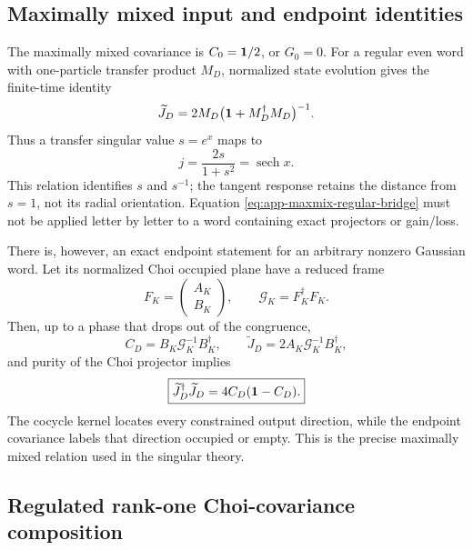 \subsection{Maximally mixed input and endpoint identities}

The maximally mixed covariance is \(C_0=\mathbf{1}/2\), or \(G_0=0\).  For a
regular even word with one-particle transfer product \(M_D\), normalized
state evolution gives the finite-time identity
\begin{equation}
    \widetilde J_D
    =2M_D\bigl(\mathbf{1}+M_D^\dagger M_D\bigr)^{-1}.
    \label{eq:app-maxmix-regular-bridge}
\end{equation}
Thus a transfer singular value \(s=e^x\) maps to
\begin{equation}
    j=\frac{2s}{1+s^2}=\operatorname{sech}x.
    \label{eq:app-radial-tangent-map}
\end{equation}
This relation identifies \(s\) and \(s^{-1}\); the tangent response retains
the distance from \(s=1\), not its radial orientation.  Equation
\eqref{eq:app-maxmix-regular-bridge} must not be applied letter by letter to
a word containing exact projectors or gain/loss.

There is, however, an exact endpoint statement for an arbitrary nonzero
Gaussian word.  Let its normalized Choi occupied plane have a reduced frame
\begin{equation}
    F_K=\begin{pmatrix}A_K\\ B_K\end{pmatrix},
    \qquad \mathcal G_K=F_K^\dagger F_K.
\end{equation}
Then, up to a phase that drops out of the congruence,
\begin{equation}
    \boxed{
    C_D=B_K\mathcal G_K^{-1}B_K^\dagger,
    \qquad
    \widetilde J_D=2A_K\mathcal G_K^{-1}B_K^\dagger,}
    \label{eq:app-maxmix-endpoint-frame}
\end{equation}
and purity of the Choi projector implies
\begin{equation}
    \boxed{
    \widetilde J_D^\dagger\widetilde J_D
    =4C_D(\mathbf{1}-C_D).}
    \label{eq:app-endpoint-cocycle-occupation}
\end{equation}
The cocycle kernel locates every constrained output direction, while the
endpoint covariance labels that direction occupied or empty.  This is the
precise maximally mixed relation used in the singular theory.

\subsection{Regulated rank-one Choi-covariance composition}
\label{app:regulated-choi-composition}

